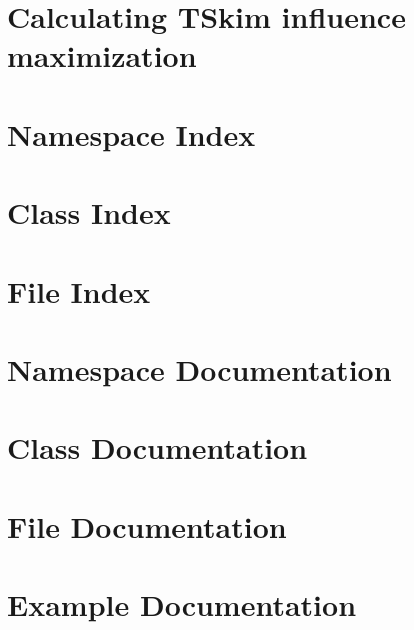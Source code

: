 \documentclass[twoside]{book}
\newcommand{\+}{\discretionary{\mbox{\scriptsize$\hookleftarrow$}}{}{}}
\newcommand{\clearemptydoublepage}{%
  \newpage{\pagestyle{empty}\cleardoublepage}%
}
\begin{document}
\chapter{Calculating T\+Skim influence maximization}
\label{TSkimTut}
\hypertarget{TSkimTut}{}

\chapter{Namespace Index}

\chapter{Class Index}

\chapter{File Index}

\chapter{Namespace Documentation}



\chapter{Class Documentation}







\chapter{File Documentation}







\chapter{Example Documentation}





\backmatter
\newpage
{}
\clearemptydoublepage
{}
\printindex
\end{document}
